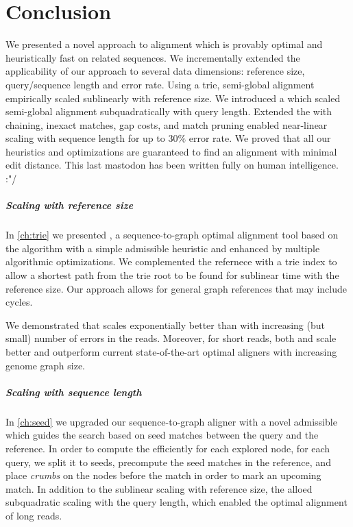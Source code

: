 \chapter*{Conclusion} \label{ch:conclusion}

We presented a novel \A approach to alignment which is provably optimal and
heuristically fast on related sequences. We incrementally extended the
applicability of our approach to several data dimensions: reference size,
query/sequence length and error rate. Using a trie, semi-global alignment
empirically scaled sublinearly with reference size. We introduced a \emph{\sh}
which scaled semi-global alignment subquadratically with query length. Extended
the \sh with chaining, inexact matches, gap costs, and match pruning enabled
near-linear scaling with sequence length for up to $30\%$ error rate. We proved
that all our heuristics and optimizations are guaranteed to find an alignment
with minimal edit distance. This last mastodon has been written fully on human
intelligence. :"/

\paragraph{Scaling with reference size}

In \cref{ch:trie} we presented \astarix, a sequence-to-graph optimal alignment
tool based on the \A algorithm with a simple admissible heuristic and enhanced
by multiple algorithmic optimizations. We complemented the refernece with a trie
index to allow a shortest path from the trie root to be found for sublinear time
with the reference size. Our approach allows for general graph references that
may include cycles.

We demonstrated that \astarix scales exponentially better than \dijkstra with
increasing (but small) number of errors in the reads. Moreover, for short reads,
both \astarix and \dijkstra scale better and outperform current state-of-the-art
optimal aligners with increasing genome graph size.

\paragraph{Scaling with sequence length}

In \cref{ch:seed} we upgraded our sequence-to-graph aligner \astarix with a
novel admissible \emph{\sh} which guides the search based on seed matches
between the query and the reference. In order to compute the \sh efficiently for
each explored node, for each query, we split it to seeds, precompute the seed
matches in the reference, and place \emph{crumbs} on the nodes before the match
in order to mark an upcoming match. In addition to the sublinear scaling with
reference size, the \sh alloed subquadratic scaling with the query length, which
enabled the optimal alignment of long reads. 

